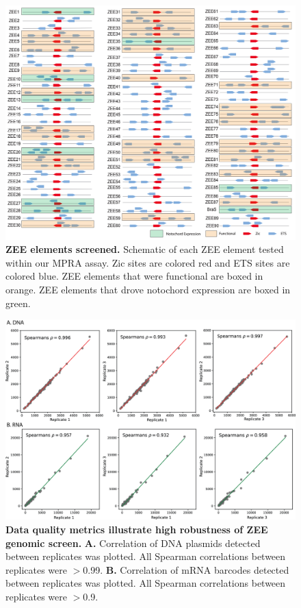 \begin{figure}[h]
    \centering
    \includegraphics[scale=.2]{2_figures-and-files/FigS1_ZEE-Library.png}
    \caption[ZEE elements screened]{\textbf{ZEE elements screened.} Schematic of each ZEE element tested within our MPRA assay. Zic sites are colored red and ETS sites are colored blue. ZEE elements that were functional are boxed in orange. ZEE elements that drove notochord expression are boxed in green.}
    \label{fig:supplement zee elements screened}
\end{figure}

\begin{figure}[p]
    \centering
    \includegraphics[scale=.75]{2_figures-and-files/FigS2_Data-QC.png}
    \caption[Data quality metrics illustrate high robustness of ZEE genomic screen]{\textbf{Data quality metrics illustrate high robustness of ZEE genomic screen.} \textbf{A.} Correlation of DNA plasmids detected between replicates was plotted. All Spearman correlations between replicates were $>$0.99. \textbf{B.} Correlation of mRNA barcodes detected between replicates was plotted. All Spearman correlations between replicates were $>$0.9.}
    \label{fig:supplement notochord data qc}
\end{figure}

